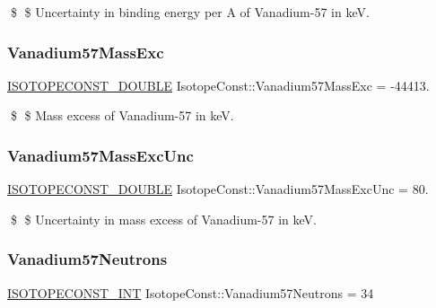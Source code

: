 \$ \$ Uncertainty in binding energy per A of Vanadium-\/57 in keV. \mbox{\label{group___isotope_const-_vanadium-_v57_ga93ce047865c4a7e8a3fe0b21397220f7}} 
\subsubsection{\texorpdfstring{Vanadium57\+Mass\+Exc}{Vanadium57MassExc}}
{\footnotesize\ttfamily \mbox{\hyperlink{group___isotope_const-_macros_ga8f45a7272ce02c0b4c65c44636ed719a}{I\+S\+O\+T\+O\+P\+E\+C\+O\+N\+S\+T\+\_\+\+D\+O\+U\+B\+LE}} Isotope\+Const\+::\+Vanadium57\+Mass\+Exc = -\/44413.}

\$ \$ Mass excess of Vanadium-\/57 in keV. \mbox{\label{group___isotope_const-_vanadium-_v57_gad7569068869cdd2f58e455db8702b5ab}} 
\subsubsection{\texorpdfstring{Vanadium57\+Mass\+Exc\+Unc}{Vanadium57MassExcUnc}}
{\footnotesize\ttfamily \mbox{\hyperlink{group___isotope_const-_macros_ga8f45a7272ce02c0b4c65c44636ed719a}{I\+S\+O\+T\+O\+P\+E\+C\+O\+N\+S\+T\+\_\+\+D\+O\+U\+B\+LE}} Isotope\+Const\+::\+Vanadium57\+Mass\+Exc\+Unc = 80.}

\$ \$ Uncertainty in mass excess of Vanadium-\/57 in keV. \mbox{\label{group___isotope_const-_vanadium-_v57_ga316f21fa490fe596399e36e3d3ebcc83}} 
\subsubsection{\texorpdfstring{Vanadium57\+Neutrons}{Vanadium57Neutrons}}
{\footnotesize\ttfamily \mbox{\hyperlink{group___isotope_const-_macros_ga5f18360b3e99483a35c32d789e62621c}{I\+S\+O\+T\+O\+P\+E\+C\+O\+N\+S\+T\+\_\+\+I\+NT}} Isotope\+Const\+::\+Vanadium57\+Neutrons = 34}

